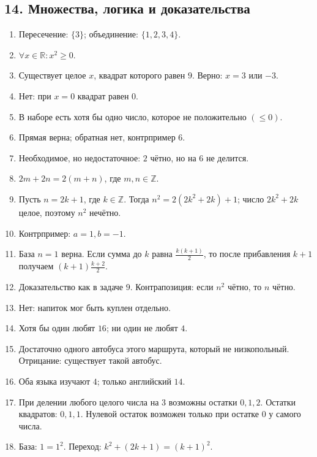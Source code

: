 \documentclass[12pt,a4paper]{article}
\theoremstyle{definition}
\theoremstyle{plain}
\theoremstyle{remark}
\newcommand{\starmark}{\ensuremath{{}^{\ast}}}
\begin{document}
\subsection*{14. Множества, логика и доказательства}
\begin{enumerate}[label=14.\arabic*.,leftmargin=2.8em,itemsep=5pt]
\item Пересечение: \(\{3\}\); объединение: \(\{1,\allowbreak 2,\allowbreak 3,\allowbreak 4\}\).
\item \(\forall  x \in  \mathbb{R} : x^{2} \ge  0\).
\item Существует целое \(x\), квадрат которого равен \(9\). Верно: \(x = 3\) или \(- 3\).
\item Нет: при \(x = 0\) квадрат равен \(0\).
\item В наборе есть хотя бы одно число, которое не положительно \((\le  0)\).
\item Прямая верна; обратная нет, контрпример \(6\).
\item Необходимое, но недостаточное: \(2\) чётно, но на \(6\) не делится.
\item \(2 m + 2 n = 2 (m + n)\), где \(m,\allowbreak n \in  \mathbb{Z}\).
\item Пусть \(n=2k+1\), где \(k\in\mathbb Z\). Тогда \(n^2=2(2k^2+2k)+1\); число \(2k^2+2k\) целое, поэтому \(n^2\) нечётно.
\item Контрпример: \(a = 1,\allowbreak b = - 1\).
\item База \(n = 1\) верна. Если сумма до \(k\) равна \(\frac{k (k + 1)}{2}\), то после прибавления \(k + 1\) получаем \((k + 1) \frac{k + 2}{2}\).
\item Доказательство как в задаче \(9\). Контрапозиция: если \(n^{2}\) чётно, то \(n\) чётно.
\item Нет: напиток мог быть куплен отдельно.
\item Хотя бы один любят \(16\); ни один не любят \(4\).
\item Достаточно одного автобуса этого маршрута, который не низкопольный. Отрицание: существует такой автобус.
\item[\textbf{14.16.}\starmark] Оба языка изучают \(4\); только английский \(14\).
\item[\textbf{14.17.}\starmark] При делении любого целого числа на \(3\) возможны остатки \(0,1,2\). Остатки квадратов: \(0,\allowbreak 1,\allowbreak 1\). Нулевой остаток возможен только при остатке \(0\) у самого числа.
\item[\textbf{14.18.}\starmark] База: \(1 = 1^{2}\). Переход: \(k^{2} + (2 k + 1) = (k + 1)^{2}\).
\end{enumerate}
\end{document}
